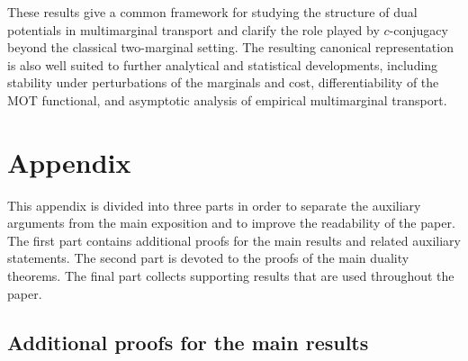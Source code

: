 \documentclass[twoside,11pt,a4paper]{article}
\begin{document}
These results give a common framework for studying the structure of dual potentials in multimarginal transport and clarify the role played by \(c\)-conjugacy beyond the classical two-marginal setting. The resulting canonical representation is also well suited to further analytical and statistical developments, including stability under perturbations of the marginals and cost, differentiability of the MOT functional, and asymptotic analysis of empirical multimarginal transport.














 
\appendix







\appendix


\section{Appendix}\label{secapp}
This appendix is divided into three parts in order to separate the auxiliary
arguments from the main exposition and to improve the readability of the paper.
The first part contains additional proofs for the main results and related
auxiliary statements. The second part is devoted to the proofs of the main
duality theorems. The final part collects supporting results that are used
throughout the paper.



\subsection{Additional proofs for the main results}\label{app}
\end{document}
